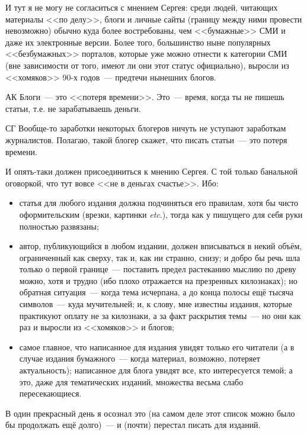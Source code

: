 И тут я не могу не согласиться с мнением Сергея: среди людей, читающих материалы <<по делу>>, блоги и личные сайты (границу между ними провести невозможно) обычно куда более востребованы, чем <<бумажные>> СМИ и даже их электронные версии. Более того, большинство ныне популярных <<безбумажных>> порталов, которые уже можно отнести к категории СМИ (вне зависимости от того, имеют ли они этот статус официально), выросли из <<хомяков>> 90-х годов~--- предтечи нынешних блогов.

\begin{shadequote}[r]{АК}
Блоги~--- это <<потеря времени>>. Это~--- время, когда ты не пишешь статьи, т.е. не зарабатываешь деньги.
\end{shadequote}


\begin{shadequote}[r]{СГ}
Вообще-то заработки некоторых блогеров ничуть не уступают заработкам журналистов. Полагаю, такой блогер скажет, что писать статьи~--- это потеря времени.
\end{shadequote}

И опять-таки должен присоединиться к мнению Сергея. С той только банальной оговоркой, что тут вовсе <<не в деньгах счастье>>. Ибо:

\begin{itemize}
	\item статья для любого издания должна подчиняться его правилам, хотя бы чисто оформительским (врезки, картинки \textit{etc}.), тогда как у пишущего для себя руки полностью развязаны; 
	\item автор, публикующийся в любом издании, должен вписываться в некий объём, ограниченный как сверху, так и, как ни странно, снизу; и добро бы речь шла только о первой границе~--- поставить предел растеканию мыслию по древу можно, хотя и трудно (ибо плохо отражается на презренных килознаках); но обратная ситуация~--- когда тема исчерпана, а до конца полосы ещё тысяча символов~--- куда мучительней; и, к слову, мне известны издания, которые практикуют оплату не за килознаки, а за факт раскрытия темы~--- но они как раз и выросли из <<хомяков>> и блогов; 
	\item самое главное, что написанное для издания увидят только его читатели (а в случае издания бумажного~--- когда материал, возможно, потеряет актуальность); написанное для блога увидят все, кто интересуется темой; а это, даже для тематических изданий, множества весьма слабо пересекающиеся. 
\end{itemize}

В один прекрасный день я осознал это (на самом деле этот список можно было бы продолжать ещё долго)~--- и (почти) перестал писать для изданий.

